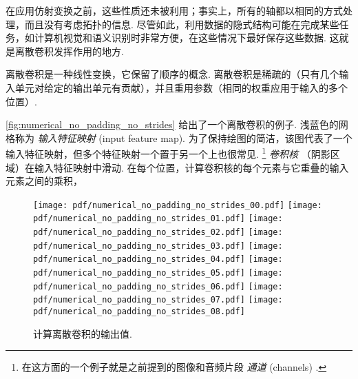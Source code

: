 \documentclass[notitlepage]{ctexrep}
\begin{document}
在应用仿射变换之前，这些性质还未被利用；事实上，所有的轴都以相同的方式处理，而且没有考虑拓扑的信息. 尽管如此，利用数据的隐式结构可能在完成某些任务，如计算机视觉和语义识别时非常方便，在这些情况下最好保存这些数据. 这就是离散卷积发挥作用的地方. 

离散卷积是一种线性变换，它保留了顺序的概念. 离散卷积是稀疏的（只有几个输入单元对给定的输出单元有贡献），并且重用参数（相同的权重应用于输入的多个位置）. 

\autoref{fig:numerical_no_padding_no_strides} 给出了一个离散卷积的例子. 浅蓝色的网格称为 {\em 输入特征映射} (input feature map). 为了保持绘图的简洁，该图代表了一个输入特征映射，但多个特征映射一个置于另一个上也很常见. \footnote{%
    在这方面的一个例子就是之前提到的图像和音频片段 {\em 通道\/} (channels) .} {\em 卷积核\/} （阴影区域）在输入特征映射中滑动. 在每个位置，计算卷积核的每个元素与它重叠的输入元素之间的乘积，

\begin{figure}[H]
    \centering
\end{figure}

\begin{figure}[p]
    \centering
    \texttt{[image: pdf/numerical\_no\_padding\_no\_strides\_00.pdf]}
    \texttt{[image: pdf/numerical\_no\_padding\_no\_strides\_01.pdf]}
    \texttt{[image: pdf/numerical\_no\_padding\_no\_strides\_02.pdf]}
    \texttt{[image: pdf/numerical\_no\_padding\_no\_strides\_03.pdf]}
    \texttt{[image: pdf/numerical\_no\_padding\_no\_strides\_04.pdf]}
    \texttt{[image: pdf/numerical\_no\_padding\_no\_strides\_05.pdf]}
    \texttt{[image: pdf/numerical\_no\_padding\_no\_strides\_06.pdf]}
    \texttt{[image: pdf/numerical\_no\_padding\_no\_strides\_07.pdf]}
    \texttt{[image: pdf/numerical\_no\_padding\_no\_strides\_08.pdf]}
    \caption{\label{fig:numerical_no_padding_no_strides} 计算离散卷积的输出值.}
\end{figure}
\end{document}
